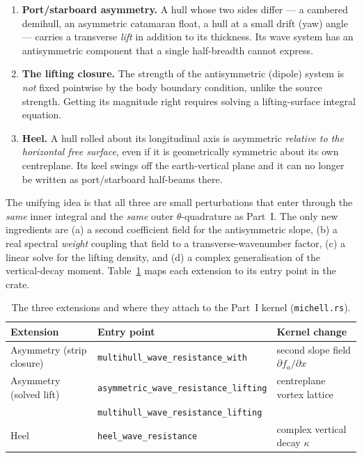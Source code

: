 \documentclass[11pt]{article}
\begin{document}
\begin{enumerate}
  \item \textbf{Port/starboard asymmetry.} A hull whose two sides differ ---
        a cambered demihull, an asymmetric catamaran float, a hull at a small
        drift (yaw) angle --- carries a transverse \emph{lift} in addition to
        its thickness. Its wave system has an antisymmetric component that a
        single half-breadth cannot express.
  \item \textbf{The lifting closure.} The strength of the antisymmetric
        (dipole) system is \emph{not} fixed pointwise by the body boundary
        condition, unlike the source strength. Getting its magnitude right
        requires solving a lifting-surface integral equation.
  \item \textbf{Heel.} A hull rolled about its longitudinal axis is asymmetric
        \emph{relative to the horizontal free surface}, even if it is
        geometrically symmetric about its own centreplane. Its keel swings off
        the earth-vertical plane and it can no longer be written as
        port/starboard half-beams there.
\end{enumerate}

The unifying idea is that all three are small perturbations that enter through
the \emph{same} inner integral and the \emph{same} outer $\theta$-quadrature as
Part~I. The only new ingredients are (a) a second coefficient field for the
antisymmetric slope, (b) a real spectral \emph{weight} coupling that field to a
transverse-wavenumber factor, (c) a linear solve for the lifting density, and
(d) a complex generalisation of the vertical-decay moment. Table~\ref{tab:map}
maps each extension to its entry point in the crate.

\begin{table}[h]
  \centering
  \begin{tabular}{lll}
    \toprule
    Extension & Entry point & Kernel change \\
    \midrule
    Asymmetry (strip closure)
      & \texttt{multihull\_wave\_resistance\_with}
      & second slope field $\partial f_a/\partial x$ \\
    Asymmetry (solved lift)
      & \texttt{asymmetric\_wave\_resistance\_lifting}
      & centreplane vortex lattice \\
      & \texttt{multihull\_wave\_resistance\_lifting} & \\
    Heel
      & \texttt{heel\_wave\_resistance}
      & complex vertical decay $\kappa$ \\
    \bottomrule
  \end{tabular}
  \caption{The three extensions and where they attach to the Part~I kernel
  (\texttt{michell.rs}).}
  \label{tab:map}
\end{table}
\end{document}
